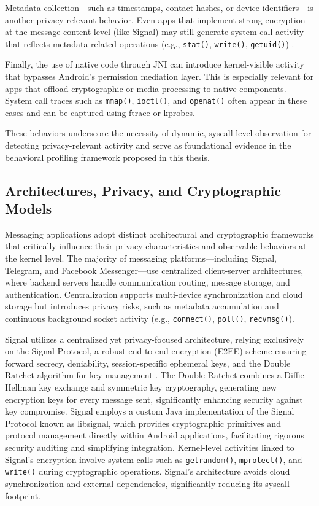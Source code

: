 \documentclass[a4paper,12pt]{report}
\begin{document}
Metadata collection—such as timestamps, contact hashes, or device identifiers—is another privacy-relevant behavior. Even apps that implement strong encryption at the message content level (like Signal) may still generate system call activity that reflects metadata-related operations (e.g., \texttt{stat()}, \texttt{write()}, \texttt{getuid()}) \cite{arxiv2020metadata}.

Finally, the use of native code through JNI can introduce kernel-visible activity that bypasses Android’s permission mediation layer. This is especially relevant for apps that offload cryptographic or media processing to native components. System call traces such as \texttt{mmap()}, \texttt{ioctl()}, and \texttt{openat()} often appear in these cases and can be captured using ftrace or kprobes.

These behaviors underscore the necessity of dynamic, syscall-level observation for detecting privacy-relevant activity and serve as foundational evidence in the behavioral profiling framework proposed in this thesis.

\subsection{Architectures, Privacy, and Cryptographic Models}
Messaging applications adopt distinct architectural and cryptographic frameworks that critically influence their privacy characteristics and observable behaviors at the kernel level. The majority of messaging platforms—including Signal, Telegram, and Facebook Messenger—use centralized client-server architectures, where backend servers handle communication routing, message storage, and authentication. Centralization supports multi-device synchronization and cloud storage but introduces privacy risks, such as metadata accumulation and continuous background socket activity (e.g., \texttt{connect()}, \texttt{poll()}, \texttt{recvmsg()}).

Signal utilizes a centralized yet privacy-focused architecture, relying exclusively on the Signal Protocol, a robust end-to-end encryption (E2EE) scheme ensuring forward secrecy, deniability, session-specific ephemeral keys, and the Double Ratchet algorithm for key management \cite{signalwhitepaper}. The Double Ratchet combines a Diffie-Hellman key exchange and symmetric key cryptography, generating new encryption keys for every message sent, significantly enhancing security against key compromise. Signal employs a custom Java implementation of the Signal Protocol known as libsignal, which provides cryptographic primitives and protocol management directly within Android applications, facilitating rigorous security auditing and simplifying integration. Kernel-level activities linked to Signal’s encryption involve system calls such as \texttt{getrandom()}, \texttt{mprotect()}, and \texttt{write()} during cryptographic operations. Signal's architecture avoids cloud synchronization and external dependencies, significantly reducing its syscall footprint.
\end{document}
